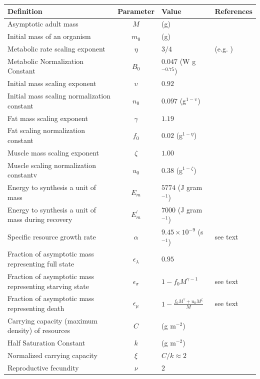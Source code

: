 \documentclass[twocolumn,preprintnumbers,amsmath,amssymb,superscriptaddress]{revtex4}
\begin{document}
\begin{bibunit}[unsrt]
\begin{table}[h]
\begin{center}
\begin{tabular}{p{3.8cm} c p{2.2cm} p{1.4cm}}
     Definition & Parameter & Value & References  \\
     \hline
   Asymptotic adult mass & $M$ & (g) &  \\
   Initial mass of an organism & $m_{0}$ & (g) &  \\
   Metabolic rate scaling exponent & $\eta$ & $3/4$  &  (e.g. \citep{West:2001bv,moses2008rmo,hou}) \\
   Metabolic Normalization Constant & $B_{0}$ & $0.047$ (W g$^{-0.75}$)    & \citep{hou}  \\
   Initial mass scaling exponent & $\upsilon$ & $0.92$ &  \citep{blueweiss1978relationships,peters1986ecological} \\
   Initial mass scaling normalization constant & $n_{0}$ & $0.097$ (g$^{1-\upsilon}$) & \citep{blueweiss1978relationships,peters1986ecological}  \\   
   Fat mass scaling exponent & $\gamma$ & $1.19$ & \citep{Lindstedt:1985hm} \\
   Fat scaling normalization constant & $f_{0}$ & $0.02$ (g$^{1-\eta}$) & \citep{Lindstedt:1985hm}\\
   Muscle mass scaling exponent & $\zeta$ & $1.00$  & \citep{Lindstedt:2002td} \\
   Muscle scaling normalization constantv& $u_{0}$ & $0.38$ (g$^{1-\zeta}$)  & \citep{Lindstedt:2002td} \\
   Energy to synthesis a unit of mass & $E_{m}$ & $5774$ (J gram$^{-1}$)  &  \citep{moses2008rmo,West:2001bv,hou} \\
   Energy to synthesis a unit of mass during recovery & $E_{m}^{\prime}$ & $7000$ (J gram$^{-1}$) & \citep{stryer,hou} \\
   Specific resource growth rate & $\alpha$ & $9.45\times10^{-9}$ (s$^{-1}$) & see text  \\
   Fraction of asymptotic mass representing full state & $\epsilon_{\lambda}$ & $0.95$ & \citep{West:2001bv}  \\
   Fraction of asymptotic mass representing starving state & $\epsilon_{\sigma}$ & $1-f_{0}M^{\gamma-1}$ & see text  \\
   Fraction of asymptotic mass representing death & $\epsilon_{\mu}$ & $1-\frac{f_{0}M^{\gamma}+u_{0}M^{\zeta}}{M}$ & see text \\
   Carrying capacity (maximum density) of resources & $C$ & (g m$^{-2}$) & \\
   Half Saturation Constant & $k$ & (g m$^{-2}$) &   \\
   Normalized carrying capacity & $\xi$ & $C/k\approx2$ &   \\
   Reproductive fecundity & $\nu$ & $2$ & \citep{}  \\ 
   

\end{tabular}
\end{center}
\end{table}
\end{bibunit}
\end{document}
